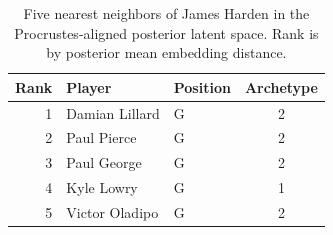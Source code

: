 \begin{table}[htbp]
  \centering\small
  \begin{tabular}{rllc}
    \toprule
    Rank & Player & Position & Archetype \\
    \midrule
    1 & Damian Lillard & G & 2 \\
    2 & Paul Pierce & G & 2 \\
    3 & Paul George & G & 2 \\
    4 & Kyle Lowry & G & 1 \\
    5 & Victor Oladipo & G & 2 \\
    \bottomrule
  \end{tabular}
  \caption{Five nearest neighbors of James Harden in the Procrustes-aligned posterior latent space. Rank is by posterior mean embedding distance.}
  \label{tab:James_Harden_neighbors}
\end{table}

